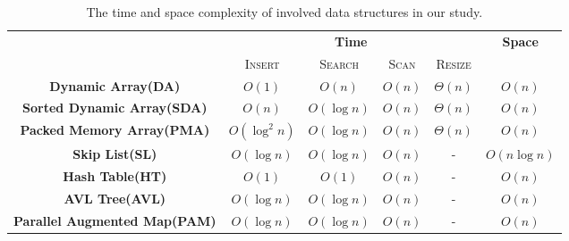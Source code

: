 \small
\begin{table}[t]
\centering
\caption{The time and space complexity of involved data structures in our study.}
\label{tab:complexity_data_structure}
\begin{tabular}{|c|cccc|c|}
\hline
                                     & \multicolumn{4}{c|}{\textbf{Time}}                                                                                                 & \multirow{2}{*}{\textbf{Space}} \\ \cline{1-5}
                                     & \multicolumn{1}{c|}{\textsc{Insert}} & \multicolumn{1}{c|}{\textsc{Search}} & \multicolumn{1}{c|}{\textsc{Scan}} & \textsc{Resize} &                                 \\ \hline
\textbf{Dynamic Array(DA)}           & \multicolumn{1}{c|}{$O(1)$}          & \multicolumn{1}{c|}{$O(n)$}          & \multicolumn{1}{c|}{$O(n)$}        & $\Theta(n)$     & $O(n)$                          \\ \hline
\textbf{Sorted Dynamic Array(SDA)}   & \multicolumn{1}{c|}{$O(n)$}          & \multicolumn{1}{c|}{$O(\log n)$}     & \multicolumn{1}{c|}{$O(n)$}        & $\Theta(n)$     & $O(n)$                          \\ \hline
\textbf{Packed Memory Array(PMA)}    & \multicolumn{1}{c|}{$O(\log^2 n)$}   & \multicolumn{1}{c|}{$O(\log n)$}     & \multicolumn{1}{c|}{$O(n)$}        & $\Theta(n)$     & $O(n)$                          \\ \hline
\textbf{Skip List(SL)}               & \multicolumn{1}{c|}{$O(\log n)$}     & \multicolumn{1}{c|}{$O(\log n)$}     & \multicolumn{1}{c|}{$O(n)$}        & -               & $O(n\log n)$                    \\ \hline
\textbf{Hash Table(HT)}              & \multicolumn{1}{c|}{$O(1)$}          & \multicolumn{1}{c|}{$O(1)$}          & \multicolumn{1}{c|}{$O(n)$}        & -               & $O(n)$                          \\ \hline
\textbf{AVL Tree(AVL)}               & \multicolumn{1}{c|}{$O(\log n)$}     & \multicolumn{1}{c|}{$O(\log n)$}     & \multicolumn{1}{c|}{$O(n)$}        & -               & $O(n)$                          \\ \hline
\textbf{Parallel Augmented Map(PAM)} & \multicolumn{1}{c|}{$O(\log n)$}     & \multicolumn{1}{c|}{$O(\log n)$}     & \multicolumn{1}{c|}{$O(n)$}        & -               & $O(n)$                          \\ \hline
\end{tabular}%
\end{table}


